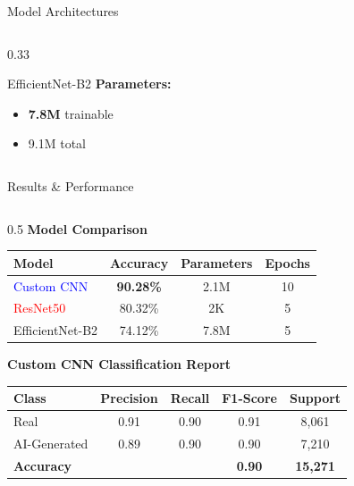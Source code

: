 \documentclass[aspectratio=169]{beamer}
\begin{document}
\begin{frame}{Model Architectures}
\begin{columns}[T]
\begin{column}{0.33\textwidth}
\begin{block}{EfficientNet-B2}
                \textbf{Parameters:}
                \begin{itemize}
                    \scriptsize
                    \item \textbf{7.8M} trainable
                    \item 9.1M total
                \end{itemize}
            \end{block}
        \end{column}
    \end{columns}
\end{frame}

\begin{frame}{Results \& Performance}
    \begin{columns}[T]
        \begin{column}{0.5\textwidth}
            \textbf{Model Comparison}
            \begin{table}[h]
                \small
                \begin{tabular}{lccc}
                    \toprule
                    \textbf{Model} & \textbf{Accuracy} & \textbf{Parameters} & \textbf{Epochs} \\
                    \midrule
                    \textcolor{blue}{Custom CNN} & \textbf{90.28\%} & 2.1M & 10 \\
                    \textcolor{red}{ResNet50} & 80.32\% & 2K & 5 \\
                    \textcolor{green!60!black}{EfficientNet-B2} & 74.12\% & 7.8M & 5 \\
                    \bottomrule
                \end{tabular}
            \end{table}
            
            \vspace{0.3cm}
            \textbf{Custom CNN Classification Report}
            \begin{table}[h]
                \tiny
                \begin{tabular}{lcccc}
                    \toprule
                    \textbf{Class} & \textbf{Precision} & \textbf{Recall} & \textbf{F1-Score} & \textbf{Support} \\
                    \midrule
                    Real & 0.91 & 0.90 & 0.91 & 8,061 \\
                    AI-Generated & 0.89 & 0.90 & 0.90 & 7,210 \\
                    \midrule
                    \textbf{Accuracy} & & & \textbf{0.90} & \textbf{15,271} \\
                    \bottomrule
                \end{tabular}
            \end{table}
            

\end{column}
\end{columns}
\end{frame}
\end{document}
